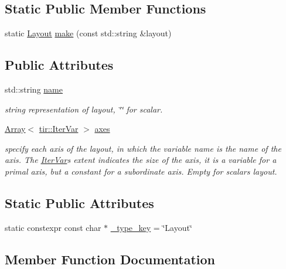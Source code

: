 \subsection*{Static Public Member Functions}
\begin{DoxyCompactItemize}
\item 
static \hyperlink{classtvm_1_1tir_1_1Layout}{Layout} \hyperlink{classtvm_1_1tir_1_1LayoutNode_a8347e996d26d9d7e4988bccf7292b3b5}{make} (const std\+::string \&layout)
\end{DoxyCompactItemize}
\subsection*{Public Attributes}
\begin{DoxyCompactItemize}
\item 
std\+::string \hyperlink{classtvm_1_1tir_1_1LayoutNode_a7cdbaa55c5e21044c01fd99d46096140}{name}
\begin{DoxyCompactList}\small\item\em string representation of layout, \char`\"{}\char`\"{} for scalar. \end{DoxyCompactList}\item 
\hyperlink{classtvm_1_1Array}{Array}$<$ \hyperlink{classtvm_1_1tir_1_1IterVar}{tir\+::\+Iter\+Var} $>$ \hyperlink{classtvm_1_1tir_1_1LayoutNode_a4287f43c0ae133205d9803f4fadc3d88}{axes}
\begin{DoxyCompactList}\small\item\em specify each axis of the layout, in which the variable name is the name of the axis. The \hyperlink{classtvm_1_1tir_1_1IterVar}{Iter\+Var}\textquotesingle{}s extent indicates the size of the axis, it is a variable for a primal axis, but a constant for a subordinate axis. Empty for scalar\textquotesingle{}s layout. \end{DoxyCompactList}\end{DoxyCompactItemize}
\subsection*{Static Public Attributes}
\begin{DoxyCompactItemize}
\item 
static constexpr const char $\ast$ \hyperlink{classtvm_1_1tir_1_1LayoutNode_aaca4fc16e14cb9867cd9f3564b4dd59f}{\+\_\+type\+\_\+key} = \char`\"{}Layout\char`\"{}
\end{DoxyCompactItemize}


\subsection{Member Function Documentation}
